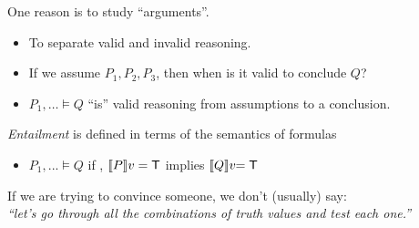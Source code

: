 \documentclass[xetex,aspectratio=169,14pt,hyperref={pdfpagelabels=true,pdflang={en-GB}}]{beamer}
\begin{document}





\begin{frame}
  One reason is to study ``arguments''.
  \begin{itemize}
  \item To separate valid and invalid reasoning.
  \item If we assume $P_1, P_2, P_3$, then when is it valid to conclude $Q$?
  \end{itemize}

  \pause
  \bigskip

  \begin{itemize}
  \item $P_1, \dots \models Q$ ``is'' valid reasoning from assumptions to a conclusion.
  \end{itemize}
  \emph{Entailment} is defined in terms of the semantics of formulas
  \begin{itemize}
  \item $P_1, ... \models Q$ if , $\llbracket P \rrbracket v = \mathsf{T}$ implies $\llbracket Q \rrbracket v \kern-3pt= \mathsf{T}$
  \end{itemize}

  \pause
  \pause
  \bigskip

  If we are trying to convince someone, we don't (usually) say: \\
  \qquad \emph{``let's go through all the combinations of truth values and test each one.''}
\end{frame}
\end{document}
